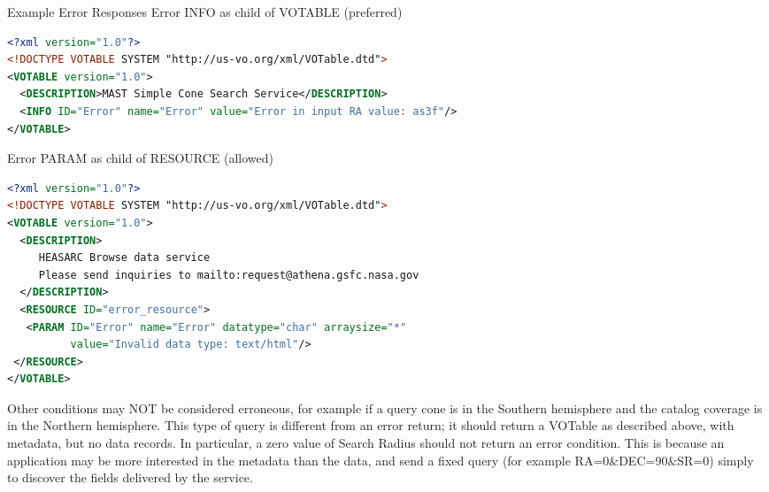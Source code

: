 \documentclass[11pt,a4paper]{ivoa}
\begin{document}
\begin{bigdescription}
	\item[Example Error Responses] Error INFO as child of VOTABLE (preferred)\\
	\begin{lstlisting}[language=XML,basicstyle=\footnotesize]
<?xml version="1.0"?>
<!DOCTYPE VOTABLE SYSTEM "http://us-vo.org/xml/VOTable.dtd">
<VOTABLE version="1.0">
  <DESCRIPTION>MAST Simple Cone Search Service</DESCRIPTION>
  <INFO ID="Error" name="Error" value="Error in input RA value: as3f"/>
</VOTABLE>
	\end{lstlisting}
	Error PARAM as child of RESOURCE (allowed)
	\begin{lstlisting}[language=XML,basicstyle=\footnotesize]
<?xml version="1.0"?>
<!DOCTYPE VOTABLE SYSTEM "http://us-vo.org/xml/VOTable.dtd">
<VOTABLE version="1.0">
  <DESCRIPTION>
     HEASARC Browse data service
     Please send inquiries to mailto:request@athena.gsfc.nasa.gov
  </DESCRIPTION>
  <RESOURCE ID="error_resource">
   <PARAM ID="Error" name="Error" datatype="char" arraysize="*"
          value="Invalid data type: text/html"/>
 </RESOURCE>
</VOTABLE>
	\end{lstlisting}
\end{bigdescription}

Other conditions may NOT be considered erroneous, for example if a query cone is in the Southern hemisphere and the catalog coverage is in the Northern hemisphere. This type of query is different from an error return; it should return a VOTable as described above, with metadata, but no data records. In particular, a zero value of Search Radius should not return an error condition. This is because an application may be more interested in the metadata than the data, and send a fixed query (for example RA=0\&DEC=90\&SR=0) simply to discover the fields delivered by the service.
\end{document}
